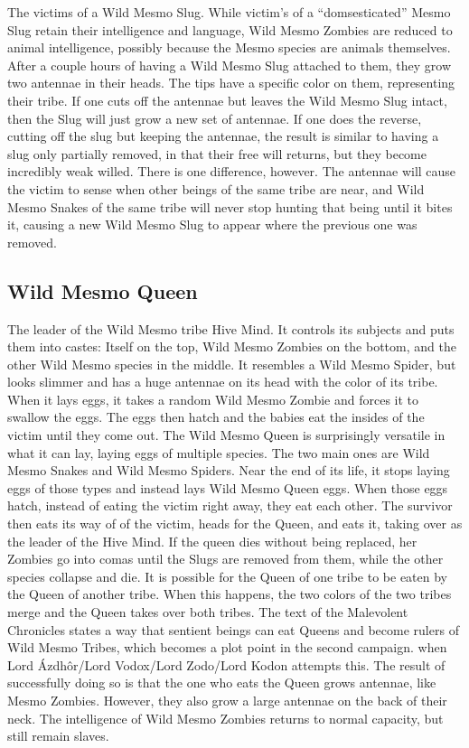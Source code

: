 \documentclass{gd-document}
\begin{document}
The victims of a Wild Mesmo Slug. While victim's of a “domsesticated”
Mesmo Slug retain their intelligence and language, Wild Mesmo Zombies
are reduced to animal intelligence, possibly because the Mesmo species
are animals themselves. After a couple hours of having a Wild Mesmo
Slug attached to them, they grow two antennae in their heads. The tips
have a specific color on them, representing their tribe. If one cuts
off the antennae but leaves the Wild Mesmo Slug intact, then the Slug
will just grow a new set of antennae. If one does the reverse, cutting
off the slug but keeping the antennae, the result is similar to having
a slug only partially removed, in that their free will returns, but
they become incredibly weak willed. There is one difference,
however. The antennae will cause the victim to sense when other beings
of the same tribe are near, and Wild Mesmo Snakes of the same tribe
will never stop hunting that being until it bites it, causing a new
Wild Mesmo Slug to appear where the previous one was removed.

\subsection{Wild Mesmo Queen}

The leader of the Wild Mesmo tribe Hive Mind. It controls its subjects
and puts them into castes: Itself on the top, Wild Mesmo Zombies on
the bottom, and the other Wild Mesmo species in the middle. It
resembles a Wild Mesmo Spider, but looks slimmer and has a huge
antennae on its head with the color of its tribe. When it lays eggs,
it takes a random Wild Mesmo Zombie and forces it to swallow the
eggs. The eggs then hatch and the babies eat the insides of the victim
until they come out. The Wild Mesmo Queen is surprisingly versatile in
what it can lay, laying eggs of multiple species. The two main ones
are Wild Mesmo Snakes and Wild Mesmo Spiders. Near the end of its
life, it stops laying eggs of those types and instead lays Wild Mesmo
Queen eggs. When those eggs hatch, instead of eating the victim right
away, they eat each other. The survivor then eats its way of of the
victim, heads for the Queen, and eats it, taking over as the leader of
the Hive Mind. If the queen dies without being replaced, her Zombies
go into comas until the Slugs are removed from them, while the other
species collapse and die. It is possible for the Queen of one tribe to
be eaten by the Queen of another tribe. When this happens, the two
colors of the two tribes merge and the Queen takes over both
tribes. The text of the Malevolent Chronicles states a way that
sentient beings can eat Queens and become rulers of Wild Mesmo Tribes,
which becomes a plot point in the second campaign. when Lord
Ázdhôr/Lord Vodox/Lord Zodo/Lord Kodon attempts this. The result of
successfully doing so is that the one who eats the Queen grows
antennae, like Mesmo Zombies. However, they also grow a large antennae
on the back of their neck. The intelligence of Wild Mesmo Zombies
returns to normal capacity, but still remain slaves.
\end{document}

